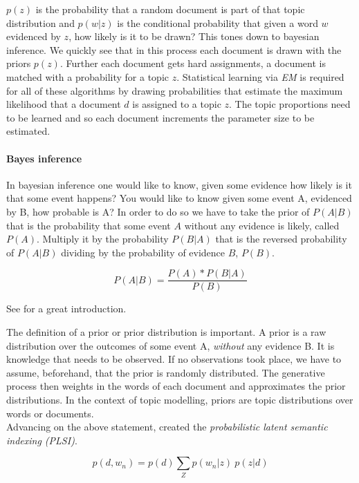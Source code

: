     $p(z)$ is the probability that a random document is part of that topic distribution and $p(w|z)$ is the conditional probability that given a word $w$ evidenced by $z$, how likely is it to be drawn? This tones down to bayesian inference. We quickly see that in this process each document is drawn with the priors $p(z)$. Further each document gets hard assignments, a document is matched with a probability for a topic $z$. Statistical learning via \emph{EM} is required for all of these algorithms by drawing probabilities that estimate the maximum likelihood that a document $d$ is assigned to a topic $z$. The topic proportions need to be learned and so each document increments the parameter size to be estimated.

    \paragraph{Bayes inference}

      In bayesian inference one would like to know, given some evidence how likely is it that some event happens? You would like to know given some event A, evidenced by B, how probable is A? In order to do so we have to take the prior of $P(A|B)$ that is the probability that some event $A$ without any evidence is likely, called $P(A)$. Multiply it by the probability $P(B|A)$ that is the reversed probability of $P(A|B)$ dividing by the probability of evidence $B$, $P(B)$.

      \begin{equation}
        P(A|B) = \frac{P(A) * P(B|A)}{P(B)}
      \end{equation}

      See \cite{Nothing} for a great introduction.
    
    The definition of a prior or prior distribution is important. A prior is a raw distribution over the outcomes of some event A, \emph{without} any evidence B. It is knowledge that needs to be observed. If no observations took place, we have to assume, beforehand, that the prior is randomly distributed. The generative process then weights in the words of each document and approximates the prior distributions. In the context of topic modelling, priors are topic distributions over words or documents.\\ 
    Advancing on the above statement, \cite{PLSA2001} created the \emph{probabilistic latent semantic indexing (PLSI)}.

      \begin{equation}
        p(d, w_n) = p(d)\sum_{Z} p(w_n|z)\:p(z|d)
      \end{equation} 

